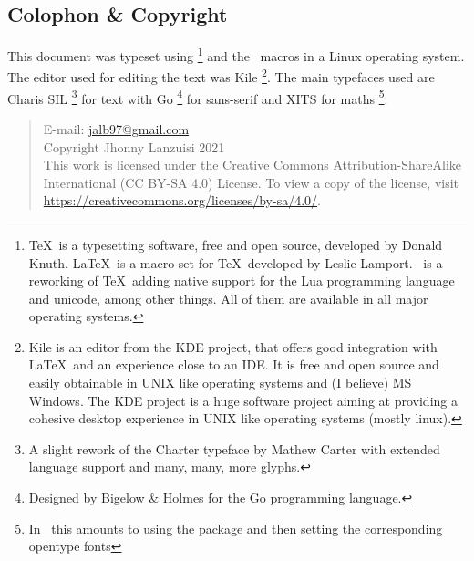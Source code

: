 \newpage
\begin{small}
    \begin{center}
    \begin{minipage}{0.4\paperwidth}
        \section*{Colophon \& Copyright}
        This document was typeset using \LuaTeX%
        \footnote{%
            \TeX\ is
            a typesetting software, free and open source,
            developed by Donald Knuth. \LaTeX\ is a macro
            set for \TeX\ developed by Leslie Lamport. \LuaTeX\ is
            a reworking of \TeX\ adding native support for the Lua
            programming language and unicode, among other things.
            All of them are available in all major
            operating systems.
        }
        and the \LaTeXe\ macros in a Linux operating system.
        The editor used for editing the text was Kile%
        \footnote{%
            Kile is an editor from the KDE project,
            that offers good integration with \LaTeX\
            and an experience close to an IDE.
            It is free and open source and easily
            obtainable in UNIX like operating systems
            and (I believe) MS Windows.
            The KDE project is a huge software project
            aiming at providing a cohesive desktop experience
            in UNIX like operating systems (mostly linux).
        }.
        The main typefaces used are Charis SIL%
        \footnote{%
            A slight rework of the Charter
            typeface by Mathew Carter
            with extended language support and many,
            many, more glyphs.
        }
        for text with Go%
        \footnote{%
            Designed by Bigelow \& Holmes for the
            Go programming language.
        }
        for sans-serif
        and XITS for maths%
        \footnote{%
            In \LuaLaTeX\ this amounts to using the package
            and then setting the corresponding
            opentype fonts
        }.

        \medskip
        \begin{quote}\ttfamily\raggedright
            E-mail: \url{jalb97@gmail.com} \\
            Copyright Jhonny Lanzuisi 2021\\
            This work is licensed under the Creative Commons Attribution-ShareAlike
            International (CC BY-SA 4.0)  License. To view a copy of the license,
            visit \url{https://creativecommons.org/licenses/by-sa/4.0/}.
        \end{quote}
    \end{minipage}
    \end{center}
\end{small}
\newpage
\tableofcontents
